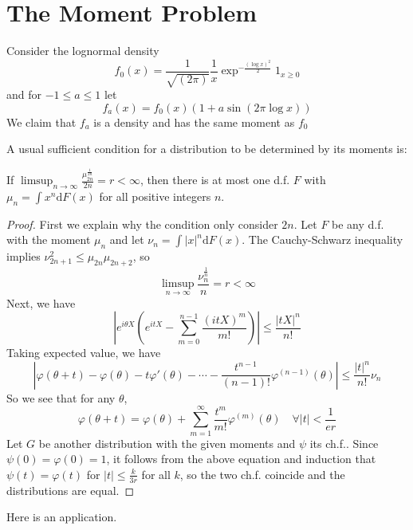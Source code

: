 \section{The Moment Problem}
\begin{example}[Heyde(1963)]
    Consider the lognormal density \[f_0(x)=\frac{1}{\sqrt{(2\pi)}}\frac{1}{x}\exp^{-\frac{(\log x)^2}{2}}1_{x\ge 0}\] 
    and for $-1\le a\le 1$ let \[f_a(x)=f_0(x)(1+a\sin(2\pi\log x))\]
    We claim that $f_a$ is a density and has the same moment as $f_0$
\end{example}
\begin{example}
    
\end{example}
A usual sufficient condition for a distribution to be determined by its moments is:
\begin{theorem}
    If $\limsup_{n\to\infty}\frac{\mu_{2n}^{\frac{1}{2n}}}{2n}=r<\infty$, then there is at most one d.f. $F$ with
    $\mu_n=\int x^n\mathrm{d}F(x)$ for all positive integers $n$.
\end{theorem}
\begin{proof}
    First we explain why the condition only consider $2n$. Let $F$ be any d.f. with the moment $\mu_n$ and let $\nu_n=\int\left|x\right|^n\mathrm{d}F(x)$.
    The Cauchy-Schwarz inequality implies $\nu_{2n+1}^2\le \mu_{2n}\mu_{2n+2}$, so \[\limsup_{n\to\infty}\frac{\nu_{n}^{\frac{1}{n}}}{n}=r<\infty\]
    Next, we have \[\left|e^{i\theta X}(e^{itX}-\sum_{m=0}^{n-1}\frac{(itX)^m}{m!})\right|\le \frac{\left|tX\right|^n}{n!}\]
    Taking expected value, we have \[\left|\varphi(\theta+t)-\varphi(\theta)-t\varphi'(\theta)-\cdots-\frac{t^{n-1}}{(n-1)!}\varphi^{(n-1)}(\theta)\right|\le \frac{\left|t\right|^n}{n!}\nu_n\]
    So we see that for any $\theta$, \[\varphi(\theta+t)=\varphi(\theta)+\sum_{m=1}^\infty\frac{t^m}{m!}\varphi^{(m)}(\theta)\quad\forall\left|t\right|<\frac{1}{er}\]
    Let $G$ be another distribution with the given moments and $\psi$ its ch.f.. Since $\psi(0)=\varphi(0)=1$, it follows from the above equation and induction that $\psi(t)=\varphi(t)$ for $\left|t\right|\le \frac{k}{3r}$ for all $k$,
    so the two ch.f. coincide and the distributions are equal.
\end{proof}
Here is an application.
\begin{theorem}
    
\end{theorem}

